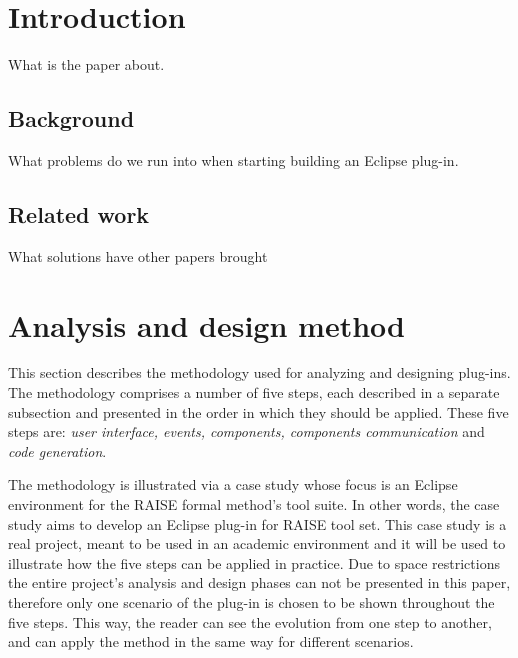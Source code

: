 \documentclass[conference]{IEEEtran}
\begin{document}

%
\IEEEpeerreviewmaketitle


\section{Introduction}
What is the paper about.


%
\subsection{Background}
What problems do we run into when starting building an Eclipse plug-in.



%
\subsection{Related work}
What solutions have other papers brought


\section{Analysis and design method}
This section describes the methodology used for analyzing and
designing plug-ins. The methodology comprises a number of five steps,
each described in a separate subsection and presented in the order in
which they should be applied. These five steps are: \emph{user
interface, events, components, components communication} and
\emph{code generation}.

The methodology is illustrated via a case study whose focus is an
Eclipse environment for the RAISE formal method's tool suite. In other
words, the case study aims to develop an Eclipse plug-in for RAISE
tool set. This case study is a real project, meant to be used in an
academic environment and it will be used to illustrate how the five
steps can be applied in practice. Due to space restrictions the entire
project's analysis and design phases can not be presented in this
paper, therefore only one scenario of the plug-in is chosen to be
shown throughout the five steps. This way, the reader can see the
evolution from one step to another, and can apply the method in the
same way for different scenarios.
\end{document}
